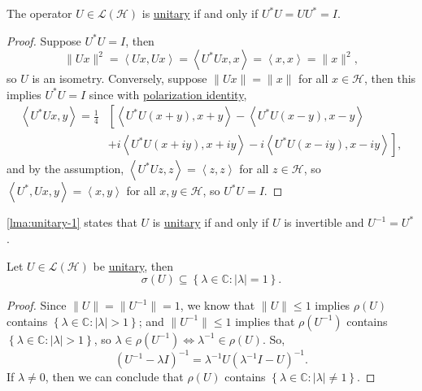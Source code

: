 \begin{lemma}\label{lma:unitary-1}
	The operator \(U\in \mathcal{L} (\mathcal{H} )\) is \hyperref[def:unitary-op]{unitary} if and only if \(U^{\ast} U = U U^{\ast} = I\).
\end{lemma}
\begin{proof}
	Suppose \(U^{\ast} U = I\), then
	\[
		\lVert Ux \rVert ^2
		= \left\langle Ux, Ux \right\rangle
		= \left\langle U^{\ast} Ux, x \right\rangle
		= \left\langle x, x \right\rangle
		= \lVert x \rVert ^2,
	\]
	so \(U\) is an isometry. Conversely, suppose \(\lVert Ux \rVert = \lVert x \rVert \) for all \(x\in \mathcal{H} \), then this implies \(U^{\ast} U = I\) since with \hyperref[lma:polarization-identity]{polarization identity},
	\[
		\begin{split}
			\left\langle U^{\ast} Ux, y \right\rangle
			= \frac{1}{4} & \left[ \left\langle U^{\ast} U(x+y), x+y \right\rangle - \left\langle U^{\ast} U(x-y), x-y \right\rangle \right.          \\
			              & + \left. i\left\langle U^{\ast} U(x+iy), x+iy \right\rangle - i\left\langle U^{\ast} U(x-iy), x-iy \right\rangle \right],
		\end{split}
	\]
	and by the assumption, \(\left\langle U^{\ast} Uz, z \right\rangle = \left\langle z, z \right\rangle \) for all \(z\in \mathcal{H} \), so \(\left\langle U^{\ast} , Ux, y \right\rangle = \left\langle x, y \right\rangle \) for all \(x, y\in \mathcal{H} \), so \(U^{\ast} U = I\).
\end{proof}

\begin{remark}
	\autoref{lma:unitary-1} states that \(U\) is \hyperref[def:unitary-op]{unitary} if and only if \(U\) is invertible and \(U ^{-1} = U^{\ast}\).
\end{remark}

\begin{proposition}
	Let \(U\in \mathcal{L} (\mathcal{H} )\) be \hyperref[def:unitary-op]{unitary}, then
	\[
		\sigma (U) \subseteq \left\{ \lambda \in \mathbb{C} \colon \vert \lambda  \vert = 1 \right\}.
	\]
\end{proposition}
\begin{proof}
	Since \(\lVert U \rVert = \lVert U^{-1}  \rVert = 1\), we know that \(\lVert U \rVert \leq 1\) implies \(\rho (U)\) contains \(\left\{ \lambda \in \mathbb{C} \colon \vert \lambda \vert > 1 \right\} \); and \(\lVert U^{-1}  \rVert \leq 1\) implies that \(\rho (U^{-1} )\) contains \(\left\{ \lambda \in \mathbb{C} \colon \vert \lambda  \vert > 1 \right\} \), so \(\lambda \in \rho (U^{-1} ) \iff \lambda ^{-1} \in \rho (U)\). So,
	\[
		(U ^{-1}  - \lambda I)^{-1} = \lambda ^{-1} U(\lambda ^{-1} I- U)^{-1} .
	\]
	If \(\lambda \neq 0\), then we can conclude that \(\rho (U)\) contains \(\left\{ \lambda \in \mathbb{C} \colon \vert \lambda  \vert \neq 1 \right\} \).
\end{proof}

